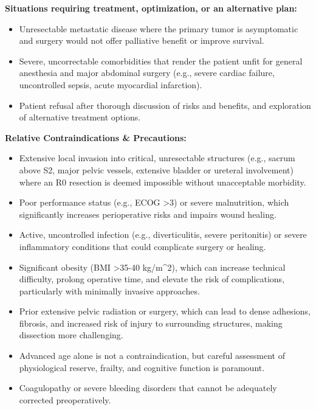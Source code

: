 \textbf{Situations requiring treatment, optimization, or an alternative plan:}
\begin{itemize}
  \item Unresectable metastatic disease where the primary tumor is asymptomatic and surgery would not offer palliative benefit or improve survival.
  
  \item Severe, uncorrectable comorbidities that render the patient unfit for general anesthesia and major abdominal surgery (e.g., severe cardiac failure, uncontrolled sepsis, acute myocardial infarction).
  
  \item Patient refusal after thorough discussion of risks and benefits, and exploration of alternative treatment options.
\end{itemize}

\textbf{Relative Contraindications \& Precautions:}
\begin{itemize}
  \item Extensive local invasion into critical, unresectable structures (e.g., sacrum above S2, major pelvic vessels, extensive bladder or ureteral involvement) where an R0 resection is deemed impossible without unacceptable morbidity.
  
  \item Poor performance status (e.g., ECOG >3) or severe malnutrition, which significantly increases perioperative risks and impairs wound healing.
  
  \item Active, uncontrolled infection (e.g., diverticulitis, severe peritonitis) or severe inflammatory conditions that could complicate surgery or healing.
  
  \item Significant obesity (BMI >35-40 kg/m\textasciicircum{}2), which can increase technical difficulty, prolong operative time, and elevate the risk of complications, particularly with minimally invasive approaches.
  
  \item Prior extensive pelvic radiation or surgery, which can lead to dense adhesions, fibrosis, and increased risk of injury to surrounding structures, making dissection more challenging.
  
  \item Advanced age alone is not a contraindication, but careful assessment of physiological reserve, frailty, and cognitive function is paramount.
  
  \item Coagulopathy or severe bleeding disorders that cannot be adequately corrected preoperatively.
\end{itemize}

